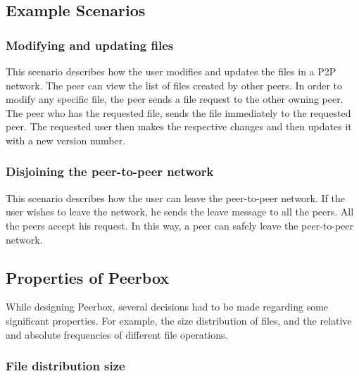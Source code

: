 
\subsection{Example Scenarios}


\subsubsection{Modifying and updating files}
This scenario describes how the user modifies and updates the files in a P2P network. The peer can view the list of files created by other peers. In order to modify any specific file, the peer sends a file request to the other owning peer. The peer who has the requested file, sends the file immediately to the requested peer. The requested user then makes the respective changes and then updates it with a new version number.  

\subsubsection{Disjoining the peer-to-peer network}
This scenario describes how the user can leave the peer-to-peer network. If the user wishes to leave the network, he sends the leave message to all the peers. All the peers accept his request. In this way, a peer can safely leave the peer-to-peer network.

\subsection{Properties of Peerbox}

While designing Peerbox, several decisions had to be made regarding some significant properties. For example, the size distribution of files, and the relative and absolute frequencies of different file operations.

\subsubsection{File distribution size}

